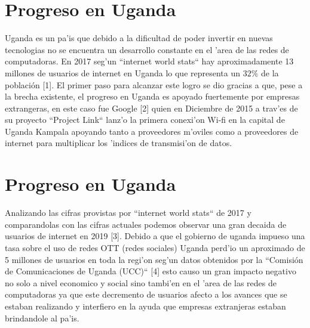 \documentclass{article}
\begin{document}
	\section{Progreso en Uganda}
		\large{
			Uganda es un pa'is que debido a la dificultad de poder invertir en nuevas tecnologias no se encuentra un desarrollo constante en el 'area de las redes de computadoras. En 2017 seg'un ``internet world stats`` hay aproximadamente 13 millones de usuarios de internet en Uganda lo que representa un $32\%$ de la población [1]. El primer paso para alcanzar este logro se dio gracias a que, pese a la brecha existente, el progreso en Uganda es apoyado fuertemente por empresas extrangeras, en este caso fue Google [2] quien en Diciembre de 2015 a trav'es de su proyecto ``Project Link`` lanz'o la primera conexi'on Wi-fi en la capital de Uganda Kampala apoyando tanto a proveedores m'oviles como a proveedores de internet para multiplicar los 'indices de transmisi'on de datos.    
		}
	\section{Progreso en Uganda}
		\large{
			Analizando las cifras provistas por ``internet world stats`` de 2017 y comparandolas con las cifras actuales podemos observar una gran decaida de usuarios de internet en 2019 [3]. Debido a que el gobierno de uganda impueso una tasa sobre el uso de redes OTT (redes sociales) Uganda perd'io un aproximado de 5 millones de usuarios en toda la regi'on seg'un datos obtenidos por la ``Comisión de Comunicaciones de Uganda (UCC)`` [4] esto causo un gran impacto negativo no solo a nivel economico y social sino tambi'en en el 'area de las redes de computadoras ya que este decremento de usuarios afecto a los avances que se estaban realizando y interfiero en la ayuda que empresas extranjeras estaban brindandole al pa'is.
		}
\end{document}
